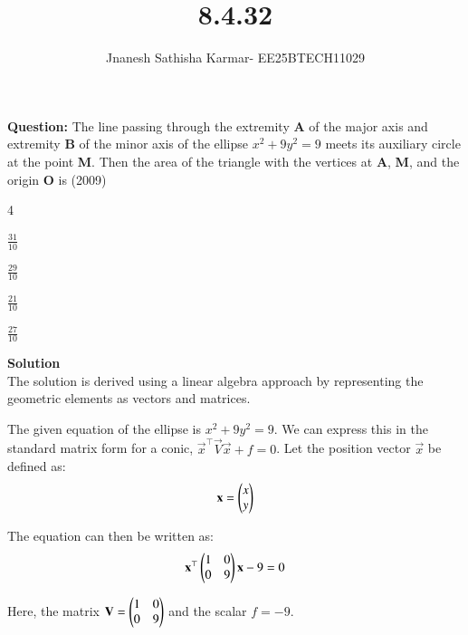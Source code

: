 \documentclass[journal]{IEEEtran}
\theoremstyle{remark}
\begin{document}
\setlength{\abovedisplayskip}{0pt}
\setlength{\belowdisplayskip}{0pt}
\setlength{\abovedisplayshortskip}{0pt}
\setlength{\belowdisplayshortskip}{0pt}

\onecolumn

\title{8.4.32}
\author{Jnanesh Sathisha Karmar- EE25BTECH11029}
\maketitle
\renewcommand{\thefigure}{\theenumi}
\renewcommand{\thetable}{\theenumi}
\noindent\textbf{Question:} The line passing through the extremity \textbf{A} of the major axis and extremity \textbf{B} of the minor axis of the ellipse $x^2 + 9y^2 = 9$ meets its auxiliary circle at the point \textbf{M}. Then the area of the triangle with the vertices at \textbf{A}, \textbf{M}, and the origin \textbf{O} is (2009) \\
\begin{enumerate}
\begin{multicols}{4}
    \item $\frac{31}{10}$
    \item $\frac{29}{10}$ 
    \item $\frac{21}{10}$
    \item  $\frac{27}{10}$
\end{multicols}
\end{enumerate}

\vspace{0.5cm}

\noindent\textbf{Solution}\\
The solution is derived using a linear algebra approach by representing the geometric elements as vectors and matrices.

The given equation of the ellipse is $x^2 + 9y^2 = 9$. We can express this in the standard matrix form for a conic, $\vec{x}^\top\vec{V}\vec{x} + f = 0$.
Let the position vector $\vec{x}$ be defined as:
\begin{align}
    \mathbf{x} = \begin{pmatrix}x \\ y\end{pmatrix}
\end{align}
    

The equation can then be written as:
\begin{align}
     \mathbf{x}^\top \begin{pmatrix}1 & 0 \\ 0 & 9\end{pmatrix} \mathbf{x} - 9 = 0
\end{align}
   
Here, the matrix $\mathbf{V} = \begin{pmatrix}1 & 0 \\ 0 & 9\end{pmatrix}$ and the scalar $f = -9$.
\end{document}

